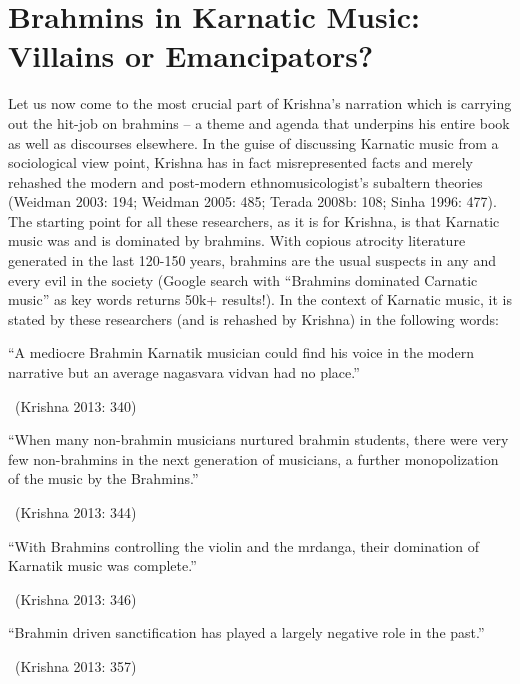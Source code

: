 \vspace{-.2cm}

\vspace{-.1cm}

\section*{Brahmins in Karnatic Music: Villains or Emancipators?}

Let us now come to the most crucial part of Krishna’s narration which is carrying out the hit-job on brahmins – a theme and agenda that underpins his entire book as well as discourses elsewhere. In the guise of discussing Karnatic music from a sociological view point, Krishna has in fact misrepresented facts and merely rehashed the modern and post-modern ethnomusicologist’s subaltern theories (Weidman 2003: 194; Weidman 2005: 485; Terada 2008b: 108; Sinha 1996: 477). The starting point for all these researchers, as it is for Krishna, is that Karnatic music was and is dominated by brahmins. With copious atrocity literature generated in the last 120-150 years, brahmins are the usual suspects in any and every evil in the society (Google search with “Brahmins dominated Carnatic music” as key words returns 50k+ results!). In the context of Karnatic music, it is stated by these researchers (and is rehashed by Krishna) in the following words:

\begin{myquote}
“A mediocre Brahmin Karnatik musician could find his voice in the modern narrative but an average nagasvara vidvan had no place.” 

~\hfill (Krishna 2013: 340)
\end{myquote}

\begin{myquote}
“When many non-brahmin musicians nurtured brahmin students, there were very few non-brahmins in the next generation of musicians, a further monopolization of the music by the Brahmins.” 

~\hfill (Krishna 2013: 344)
\end{myquote}

\begin{myquote}
“With Brahmins controlling the violin and the mrdanga, their domination of Karnatik music was complete.” 

~\hfill (Krishna 2013: 346)
\end{myquote}

\begin{myquote}
“Brahmin driven sanctification has played a largely negative role in the past.” 

~\hfill (Krishna 2013: 357)
\end{myquote}

